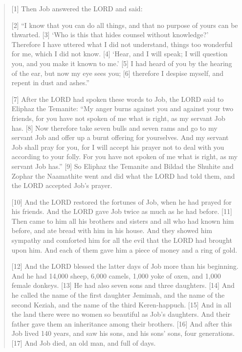 \begin{quote}
    [1] Then Job answered the LORD and said:

    [2] “I know that you can do all things,
        and that no purpose of yours can be thwarted.
    [3] ‘Who is this that hides counsel without knowledge?’
    Therefore I have uttered what I did not understand,
        things too wonderful for me, which I did not know.
    [4] ‘Hear, and I will speak;
        I will question you, and you make it known to me.’
    [5] I had heard of you by the hearing of the ear,
        but now my eye sees you;
    [6] therefore I despise myself,
        and repent in dust and ashes.”


    [7] After the LORD had spoken these words to Job, the LORD said to Eliphaz the Temanite: “My anger burns against you and against your two friends, for you have not spoken of me what is right, as my servant Job has. [8] Now therefore take seven bulls and seven rams and go to my servant Job and offer up a burnt offering for yourselves. And my servant Job shall pray for you, for I will accept his prayer not to deal with you according to your folly. For you have not spoken of me what is right, as my servant Job has.” [9] So Eliphaz the Temanite and Bildad the Shuhite and Zophar the Naamathite went and did what the LORD had told them, and the LORD accepted Job’s prayer.

    [10] And the LORD restored the fortunes of Job, when he had prayed for his friends. And the LORD gave Job twice as much as he had before. [11] Then came to him all his brothers and sisters and all who had known him before, and ate bread with him in his house. And they showed him sympathy and comforted him for all the evil that the LORD had brought upon him. And each of them gave him a piece of money and a ring of gold.

    [12] And the LORD blessed the latter days of Job more than his beginning. And he had 14,000 sheep, 6,000 camels, 1,000 yoke of oxen, and 1,000 female donkeys. [13] He had also seven sons and three daughters. [14] And he called the name of the first daughter Jemimah, and the name of the second Keziah, and the name of the third Keren-happuch. [15] And in all the land there were no women so beautiful as Job’s daughters. And their father gave them an inheritance among their brothers. [16] And after this Job lived 140 years, and saw his sons, and his sons’ sons, four generations. [17] And Job died, an old man, and full of days.
  \end{quote}
